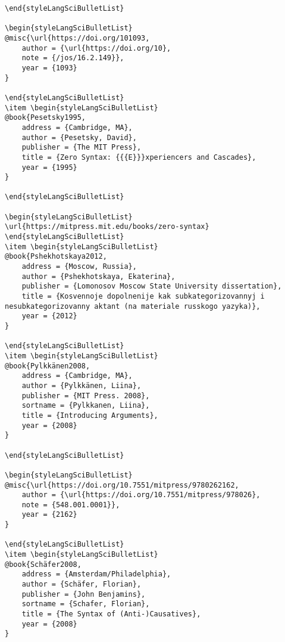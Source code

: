 \documentclass[output=paper,modfonts,nonflat,
 hidelinks
]{langsci/langscibook}
\begin{document}
\begin{verbatim}
\end{styleLangSciBulletList}

\begin{styleLangSciBulletList}
@misc{\url{https://doi.org/101093,
	author = {\url{https://doi.org/10},
	note = {/jos/16.2.149}},
	year = {1093}
}

\end{styleLangSciBulletList}
\item \begin{styleLangSciBulletList}
@book{Pesetsky1995,
	address = {Cambridge, MA},
	author = {Pesetsky, David},
	publisher = {The MIT Press},
	title = {Zero Syntax: {{{E}}}xperiencers and Cascades},
	year = {1995}
}

\end{styleLangSciBulletList}

\begin{styleLangSciBulletList}
\url{https://mitpress.mit.edu/books/zero-syntax}
\end{styleLangSciBulletList}
\item \begin{styleLangSciBulletList}
@book{Pshekhotskaya2012,
	address = {Moscow, Russia},
	author = {Pshekhotskaya, Ekaterina},
	publisher = {Lomonosov Moscow State University dissertation},
	title = {Kosvennoje dopolnenije kak subkategorizovannyj i nesubkategorizovanny aktant (na materiale russkogo yazyka)},
	year = {2012}
}

\end{styleLangSciBulletList}
\item \begin{styleLangSciBulletList}
@book{Pylkkänen2008,
	address = {Cambridge, MA},
	author = {Pylkkänen, Liina},
	publisher = {MIT Press. 2008},
	sortname = {Pylkkanen, Liina},
	title = {Introducing Arguments},
	year = {2008}
}

\end{styleLangSciBulletList}

\begin{styleLangSciBulletList}
@misc{\url{https://doi.org/10.7551/mitpress/9780262162,
	author = {\url{https://doi.org/10.7551/mitpress/978026},
	note = {548.001.0001}},
	year = {2162}
}

\end{styleLangSciBulletList}
\item \begin{styleLangSciBulletList}
@book{Schäfer2008,
	address = {Amsterdam/Philadelphia},
	author = {Schäfer, Florian},
	publisher = {John Benjamins},
	sortname = {Schafer, Florian},
	title = {The Syntax of (Anti-)Causatives},
	year = {2008}
}


\end{verbatim}
\end{document}
